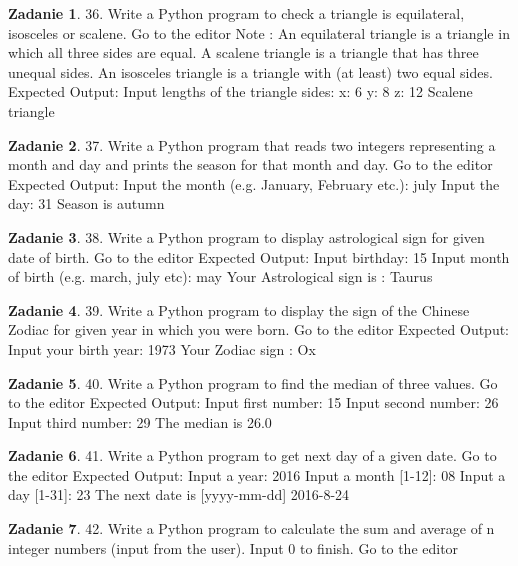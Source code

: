 \documentclass[11pt]{article}
\theoremstyle{definition}
\newtheorem{zadanie}{Zadanie}
\begin{document}
\begin{zadanie}
36. Write a Python program to check a triangle is equilateral, isosceles or scalene. Go to the editor
Note :
An equilateral triangle is a triangle in which all three sides are equal.
A scalene triangle is a triangle that has three unequal sides.
An isosceles triangle is a triangle with (at least) two equal sides.
Expected Output:
Input lengths of the triangle sides:
x: 6
y: 8
z: 12
Scalene triangle
\end{zadanie}

\begin{zadanie}
37. Write a Python program that reads two integers representing a month and day and prints the season for that month and day. Go to the editor
Expected Output:
Input the month (e.g. January, February etc.): july
Input the day: 31
Season is autumn
\end{zadanie}

\begin{zadanie}
38. Write a Python program to display astrological sign for given date of birth. Go to the editor
Expected Output:
Input birthday: 15
Input month of birth (e.g. march, july etc): may
Your Astrological sign is : Taurus
\end{zadanie}

\begin{zadanie}
39. Write a Python program to display the sign of the Chinese Zodiac for given year in which you were born. Go to the editor
Expected Output:
Input your birth year: 1973
Your Zodiac sign : Ox
\end{zadanie}

\begin{zadanie}
40. Write a Python program to find the median of three values. Go to the editor
Expected Output:
Input first number: 15
Input second number: 26
Input third number: 29
The median is 26.0
\end{zadanie}

\begin{zadanie}
41. Write a Python program to get next day of a given date. Go to the editor
Expected Output:
Input a year: 2016
Input a month [1-12]: 08
Input a day [1-31]: 23
The next date is [yyyy-mm-dd] 2016-8-24
\end{zadanie}

\begin{zadanie}
42. Write a Python program to calculate the sum and average of n integer numbers (input from the user). Input 0 to finish. Go to the editor
\end{zadanie}
\end{document}
